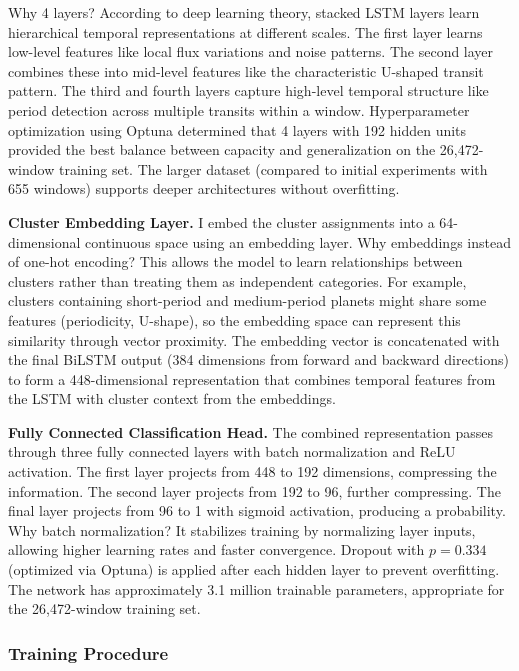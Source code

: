 \documentclass[letterpaper]{article} %
\begin{document}
Why 4 layers? According to deep learning theory, stacked LSTM layers learn hierarchical temporal representations at different scales. The first layer learns low-level features like local flux variations and noise patterns. The second layer combines these into mid-level features like the characteristic U-shaped transit pattern. The third and fourth layers capture high-level temporal structure like period detection across multiple transits within a window. Hyperparameter optimization using Optuna determined that 4 layers with 192 hidden units provided the best balance between capacity and generalization on the 26,472-window training set. The larger dataset (compared to initial experiments with 655 windows) supports deeper architectures without overfitting.

\textbf{Cluster Embedding Layer.} I embed the cluster assignments into a 64-dimensional continuous space using an embedding layer. Why embeddings instead of one-hot encoding? This allows the model to learn relationships between clusters rather than treating them as independent categories. For example, clusters containing short-period and medium-period planets might share some features (periodicity, U-shape), so the embedding space can represent this similarity through vector proximity. The embedding vector is concatenated with the final BiLSTM output (384 dimensions from forward and backward directions) to form a 448-dimensional representation that combines temporal features from the LSTM with cluster context from the embeddings.

\textbf{Fully Connected Classification Head.} The combined representation passes through three fully connected layers with batch normalization and ReLU activation. The first layer projects from 448 to 192 dimensions, compressing the information. The second layer projects from 192 to 96, further compressing. The final layer projects from 96 to 1 with sigmoid activation, producing a probability. Why batch normalization? It stabilizes training by normalizing layer inputs, allowing higher learning rates and faster convergence. Dropout with $p=0.334$ (optimized via Optuna) is applied after each hidden layer to prevent overfitting. The network has approximately 3.1 million trainable parameters, appropriate for the 26,472-window training set.

\subsubsection{Training Procedure}
\end{document}
